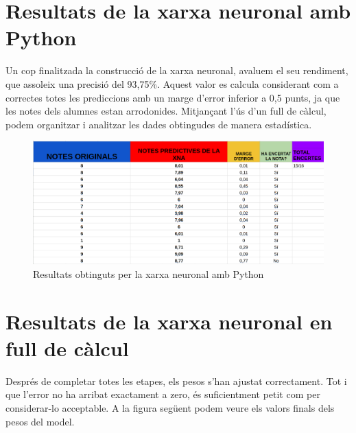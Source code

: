 \section{Resultats de la xarxa neuronal amb Python}

Un cop finalitzada la construcció de la xarxa neuronal, avaluem el seu rendiment, que assoleix una precisió del 93,75\%. Aquest valor es calcula considerant com a correctes totes les prediccions amb un marge d’error inferior a 0,5 punts, ja que les notes dels alumnes estan arrodonides. Mitjançant l’ús d’un full de càlcul, podem organitzar i analitzar les dades obtingudes de manera estadística.

\begin{figure}[h!]
 \centering
 \includegraphics[width=1\textwidth]{./figures/Resultats.png}
 \caption{Resultats obtinguts per la xarxa neuronal amb Python}
 \label{f:resultats}
\end{figure}


\section{Resultats de la xarxa neuronal en full de càlcul}\label{sec: full de càlcul}
Després de completar totes les etapes, els pesos s’han ajustat correctament. Tot i que l’error no ha arribat exactament a zero, és suficientment petit com per considerar-lo acceptable. A la figura següent podem veure els valors finals dels pesos del model.

